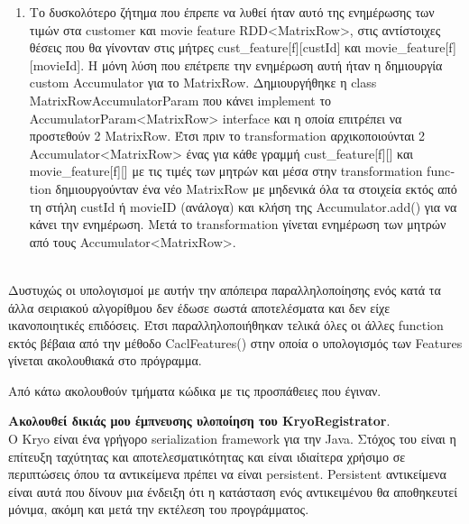 \documentclass{report}
\begin{document}
{\begin{enumerate}
  \item Το δυσκολότερο ζήτημα που έπρεπε να λυθεί ήταν αυτό της ενημέρωσης των τιμών στα \textlatin{customer} και \textlatin{movie feature RDD<MatrixRow>}, στις αντίστοιχες θέσεις που θα γίνονταν στις μήτρες \textlatin{cust\_feature[f][custId]} και \textlatin{movie\_feature[f][movieId]}. Η μόνη λύση που επέτρεπε την ενημέρωση αυτή ήταν η δημιουργία \textlatin{custom Accumulator} για το \textlatin{MatrixRow}. Δημιουργήθηκε η \textlatin{class MatrixRowAccumulatorParam} που κάνει \textlatin{implement} το \textlatin{AccumulatorParam<MatrixRow>} \textlatin{interface} και η οποία επιτρέπει να προστεθούν 2 \textlatin{MatrixRow}. Έτσι πριν το \textlatin{transformation} αρχικοποιούνται 2 \textlatin{Accumulator<MatrixRow>} ένας για κάθε γραμμή \textlatin{cust\_feature[f][]} και \textlatin{movie\_feature[f][]} με τις τιμές των μητρών και μέσα στην \textlatin{transformation function} δημιουργούνταν ένα νέο \textlatin{MatrixRow} με μηδενικά όλα τα στοιχεία εκτός από τη στήλη \textlatin{custId} ή \textlatin{movieID} (ανάλογα) και κλήση της \textlatin{Accumulator.add()} για να κάνει την ενημέρωση. Μετά το \textlatin{transformation} γίνεται ενημέρωση των μητρών από τους \textlatin{Accumulator<MatrixRow>}.
\end{enumerate}
\\

Δυστυχώς οι υπολογισμοί με αυτήν την απόπειρα παραλληλοποίησης ενός κατά τα άλλα σειριακού αλγορίθμου δεν έδωσε σωστά αποτελέσματα και δεν είχε ικανοποιητικές επιδόσεις.
Έτσι παραλληλοποιήθηκαν τελικά όλες οι άλλες \textlatin{function} εκτός βέβαια από την μέθοδο \textlatin{CaclFeatures}() στην οποία ο υπολογισμός των \textlatin{Features} γίνεται ακολουθιακά στο πρόγραμμα.

Από κάτω ακολουθούν τμήματα κώδικα με τις προσπάθειες που έγιναν.

\vspace{2mm}

\textbf{Ακολουθεί δικιάς μου έμπνευσης υλοποίηση του \textlatin{KryoRegistrator}}.
\\
Ο \textlatin{Kryo} είναι ένα γρήγορο \textlatin{serialization framework} για την \textlatin{Java}. Στόχος του είναι η επίτευξη ταχύτητας και αποτελεσματικότητας και είναι ιδιαίτερα χρήσιμο σε περιπτώσεις όπου τα αντικείμενα πρέπει να είναι \textlatin{persistent}. \textlatin{Persistent} αντικείμενα είναι αυτά που δίνουν μια ένδειξη ότι η κατάσταση ενός αντικειμένου θα αποθηκευτεί μόνιμα, ακόμη και μετά την εκτέλεση του προγράμματος.

}
\end{document}

